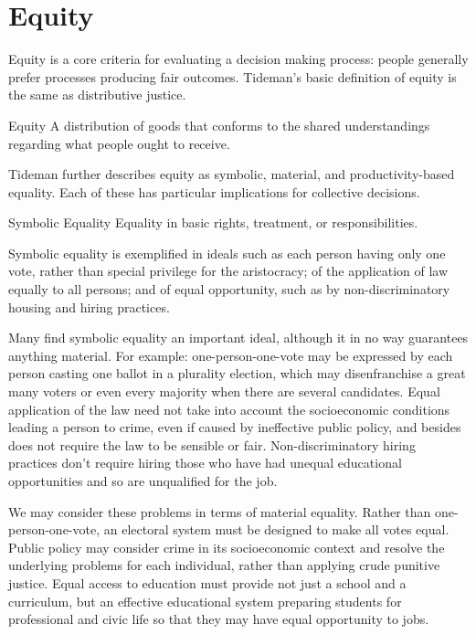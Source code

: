 \section{Equity}

Equity is a core criteria for evaluating a decision making process:  people generally prefer processes producing fair outcomes.  Tideman's basic definition of equity is the same as distributive justice.

\begin{definition}{Equity}
   A distribution of goods that conforms to the shared understandings regarding what people ought to receive.
\end{definition}

Tideman further describes equity as symbolic, material, and productivity-based equality.  Each of these has particular implications for collective decisions.

\begin{definition}{Symbolic Equality}
    Equality in basic rights, treatment, or responsibilities.
\end{definition}

Symbolic equality is exemplified in ideals such as each person having only one vote, rather than special privilege for the aristocracy; of the application of law equally to all persons; and of equal opportunity, such as by non-discriminatory housing and hiring practices.

Many find symbolic equality an important ideal, although it in no way guarantees anything material.  For example:  one-person-one-vote may be expressed by each person casting one ballot in a plurality election, which may disenfranchise a great many voters or even every majority when there are several candidates.  Equal application of the law need not take into account the socioeconomic conditions leading a person to crime, even if caused by ineffective public policy, and besides does not require the law to be sensible or fair.  Non-discriminatory hiring practices don't require hiring those who have had unequal educational opportunities and so are unqualified for the job.

We may consider these problems in terms of material equality.  Rather than one-person-one-vote, an electoral system must be designed to make all votes equal.  Public policy may consider crime in its socioeconomic context and resolve the underlying problems for each individual, rather than applying crude punitive justice.  Equal access to education must provide not just a school and a curriculum, but an effective educational system preparing students for professional and civic life so that they may have equal opportunity to jobs.

